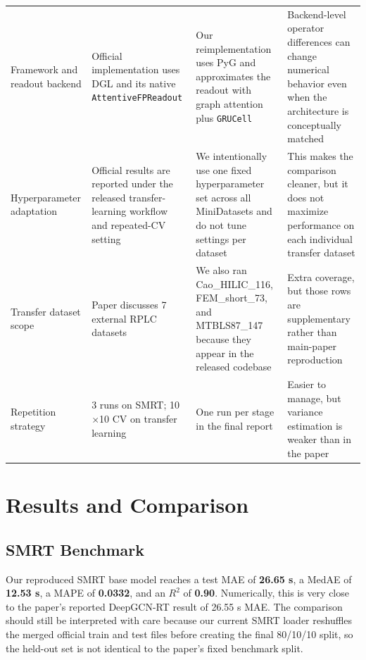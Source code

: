 \begin{table}[t]
{\begin{tabular}{p{3.2cm}p{5.1cm}p{5.1cm}p{4.1cm}}
            Framework and readout backend & Official implementation uses DGL and its native \texttt{AttentiveFPReadout}                                                               & Our reimplementation uses PyG and approximates the readout with graph attention plus \texttt{GRUCell}                      & Backend-level operator differences can change numerical behavior even when the architecture is conceptually matched     \\
            Hyperparameter adaptation     & Official results are reported under the released transfer-learning workflow and repeated-CV setting                                       & We intentionally use one fixed hyperparameter set across all MiniDatasets and do not tune settings per dataset             & This makes the comparison cleaner, but it does not maximize performance on each individual transfer dataset             \\
            Transfer dataset scope        & Paper discusses 7 external RPLC datasets                                                                                                  & We also ran Cao\_HILIC\_116, FEM\_short\_73, and MTBLS87\_147 because they appear in the released codebase                 & Extra coverage, but those rows are supplementary rather than main-paper reproduction                                    \\
            Repetition strategy           & 3 runs on SMRT; 10\(\times\)10 CV on transfer learning                                                                                    & One run per stage in the final report                                                                                      & Easier to manage, but variance estimation is weaker than in the paper                                                   \\
            \bottomrule
        \end{tabular}
    }
\end{table}

\section{Results and Comparison}

\subsection{SMRT Benchmark}

Our reproduced SMRT base model reaches a test MAE of \textbf{26.65 s}, a MedAE of \textbf{12.53 s}, a MAPE of \textbf{0.0332}, and an \(R^2\) of \textbf{0.90}. Numerically, this is very close to the paper's reported DeepGCN-RT result of 26.55 s MAE. The comparison should still be interpreted with care because our current SMRT loader reshuffles the merged official train and test files before creating the final 80/10/10 split, so the held-out set is not identical to the paper's fixed benchmark split.

